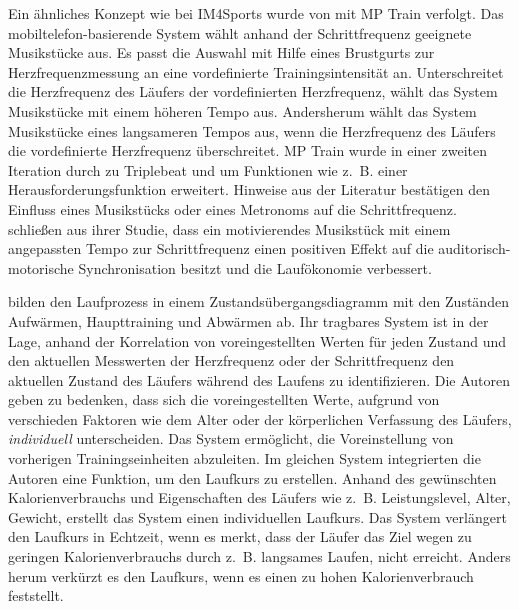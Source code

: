 Ein ähnliches Konzept wie bei IM4Sports wurde von \citet{Oliver2006} mit MP Train verfolgt. Das mobiltelefon-basierende System wählt anhand der Schrittfrequenz geeignete Musikstücke aus. Es passt die Auswahl mit Hilfe eines Brustgurts zur Herzfrequenzmessung an eine vordefinierte Trainingsintensität an. Unterschreitet die Herzfrequenz des Läufers der vordefinierten Herzfrequenz, wählt das System Musikstücke mit einem höheren Tempo aus. Andersherum wählt das System Musikstücke eines langsameren Tempos aus, wenn die Herzfrequenz des Läufers die vordefinierte Herzfrequenz überschreitet. MP Train wurde in einer zweiten Iteration durch \citet{DeOliveira2008} zu Triplebeat und um Funktionen wie z.~B. einer Herausforderungsfunktion erweitert. Hinweise aus der Literatur \citep{Bood2013} bestätigen den Einfluss eines Musikstücks oder eines Metronoms auf die Schrittfrequenz. \citet{Bood2013} schließen aus ihrer Studie, dass ein motivierendes Musikstück mit einem angepassten Tempo zur Schrittfrequenz einen positiven Effekt auf die auditorisch-motorische Synchronisation besitzt und die Laufökonomie verbessert.

\citet{Takata2007} bilden den Laufprozess in einem Zustandsübergangsdiagramm mit den Zuständen Aufwärmen, Haupttraining und Abwärmen ab. Ihr tragbares System ist in der Lage, anhand der Korrelation von voreingestellten Werten für jeden Zustand und den aktuellen Messwerten der Herzfrequenz oder der Schrittfrequenz den aktuellen Zustand des Läufers während des Laufens zu identifizieren. Die Autoren geben zu bedenken, dass sich die voreingestellten Werte, aufgrund von verschieden Faktoren wie dem Alter oder der körperlichen Verfassung des Läufers, \emph{individuell} unterscheiden. Das System ermöglicht, die Voreinstellung von vorherigen Trainingseinheiten abzuleiten. Im gleichen System integrierten die Autoren eine Funktion, um den Laufkurs zu erstellen. Anhand des gewünschten Kalorienverbrauchs und Eigenschaften des Läufers wie z.~B. Leistungslevel, Alter, Gewicht, erstellt das System einen individuellen Laufkurs. Das System verlängert den Laufkurs in Echtzeit, wenn es merkt, dass der Läufer das Ziel wegen zu geringen Kalorienverbrauchs durch z.~B. langsames Laufen, nicht erreicht. Anders herum verkürzt es den Laufkurs, wenn es einen zu hohen Kalorienverbrauch feststellt.

